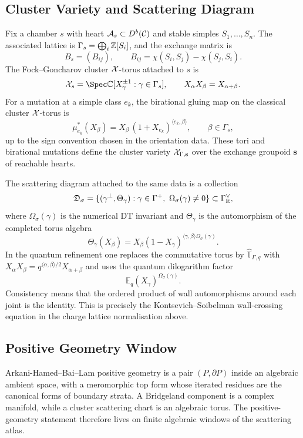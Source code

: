 \subsection*{Cluster Variety and Scattering Diagram}
\label{sec:cluster-variety-scattering}

Fix a chamber $s$ with heart $\mathcal{A}_s\subset D^{b}(\mathcal{C})$ and stable simples
$S_1,\ldots,S_n$. The associated lattice is
$\Gamma_s=\bigoplus_i\mathbb{Z}[S_i]$, and the exchange matrix is
\[
  B_s=(B_{ij}),\qquad B_{ij}=\chi(S_i,S_j)-\chi(S_j,S_i).
\]
The Fock--Goncharov cluster $\mathcal{X}$-torus attached to $s$ is
\[
  \cX_s=\Spec \C[X_\gamma^{\pm1}:\gamma\in \Gamma_s],
  \qquad
  X_\alpha X_\beta=X_{\alpha+\beta}.
\]
For a mutation at a simple class $e_k$, the birational gluing map on
the classical cluster $\mathcal{X}$-torus is
\[
  \mu_{e_k}^{*}(X_\beta)
  =
  X_\beta\,
  (1+X_{e_k})^{\langle e_k,\beta\rangle},
  \qquad \beta\in\Gamma_s,
\]
up to the sign convention chosen in the orientation data. These tori
and birational mutations define the cluster variety
$\mathcal{X}_{\Gamma,\mathbf{s}}$ over the exchange groupoid
$\mathbf{s}$ of reachable hearts.

The scattering diagram attached to the same data is a collection
\[
  \mathfrak D_\sigma
  =
  \{(\gamma^\perp,\Theta_\gamma):
      \gamma\in \Gamma^+,\ \Omega_\sigma(\gamma)\ne0\}
  \subset \Gamma_{\mathbb{R}}^\vee ,
\]
where $\Omega_\sigma(\gamma)$ is the numerical DT invariant and
$\Theta_\gamma$ is the automorphism of the completed torus algebra
\[
  \Theta_\gamma(X_\beta)
  =
  X_\beta
  (1-X_\gamma)^{\langle\gamma,\beta\rangle\Omega_\sigma(\gamma)}.
\]
In the quantum refinement one replaces the commutative torus by
$\widehat{\mathbb T}_{\Gamma,q}$ with
$X_\alpha X_\beta=q^{\langle\alpha,\beta\rangle/2}X_{\alpha+\beta}$ and
uses the quantum dilogarithm factor
\[
  \mathbb E_q(X_\gamma)^{\Omega_\sigma(\gamma)}.
\]
Consistency means that the ordered product of wall automorphisms around
each joint is the identity. This is precisely the
Kontsevich--Soibelman wall-crossing equation in the charge lattice
normalisation above.

\subsection*{Positive Geometry Window}
\label{sec:positive-geometry-window}

Arkani-Hamed--Bai--Lam positive geometry is a pair $(P,\partial P)$
inside an algebraic ambient space, with a meromorphic top form whose
iterated residues are the canonical forms of boundary strata. A
Bridgeland component is a complex manifold, while a cluster scattering
chart is an algebraic torus. The positive-geometry statement therefore
lives on finite algebraic windows of the scattering atlas.

